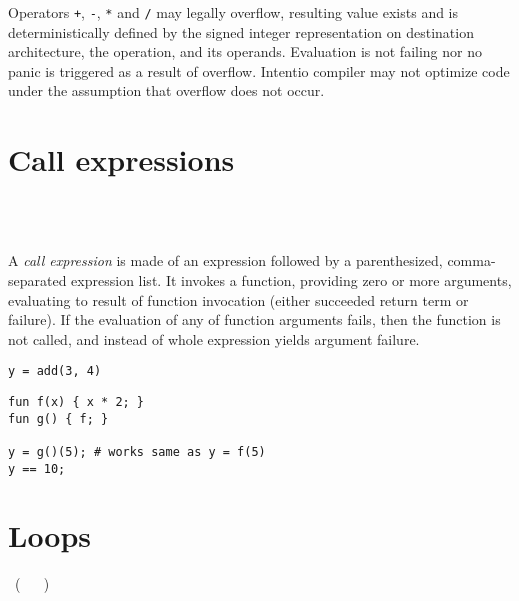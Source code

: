 Operators \lstinline{+}, \lstinline{-}, \lstinline{*} and \lstinline{/} may legally overflow, resulting value exists and is deterministically defined by the signed integer representation on destination architecture, the operation, and its operands. Evaluation is not failing nor no panic is triggered as a result of overflow. Intentio compiler may not optimize code under the assumption that overflow does not occur.

\section{Call expressions}

\begin{bnf}
   \eq {} \ \term{(} \  \ \term{)} \\
   \eq {} \  \ \gtry{\term{,}}
\end{bnf}

A \emph{call expression} is made of an expression followed by a parenthesized, comma-separated expression list. It invokes a function, providing zero or more arguments, evaluating to result of function invocation (either succeeded return term or failure). If the evaluation of any of function arguments fails, then the function is not called, and instead of whole expression yields argument failure.

\begin{example}
\begin{lstlisting}
y = add(3, 4)
\end{lstlisting}
\end{example}

\begin{example}
\begin{lstlisting}[mathescape=true]
fun f(x) { x * 2; }
fun g() { f; }

y = g()(5); # works same as y = f(5)
y == 10;
\end{lstlisting}
\end{example}

\section{Loops}

\begin{bnf}
   \eq {} \ ( \  \gor {} \ ) \ 
\end{bnf}

